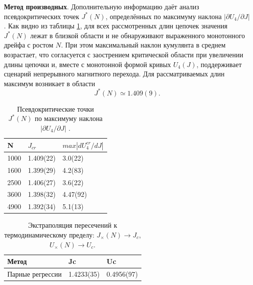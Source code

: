   
  
  
      \textbf{Метод производных}.  
  Дополнительную информацию даёт анализ псевдокритических точек $J^*(N)$, определённых по максимуму наклона $|\partial U_4/\partial J|$. 
  Как видно из таблицы \ref{tab:binder_derivative_points_XY}, для всех рассмотренных длин цепочек значения $J^*(N)$ лежат в близкой области и не обнаруживают выраженного монотонного дрейфа с ростом $N$. 
  При этом максимальный наклон кумулянта в среднем возрастает, что согласуется с заострением критической области при увеличении длины цепочки и, вместе с монотонной формой кривых $U_4(J)$, поддерживает сценарий непрерывного магнитного перехода.
Для рассматриваемых длин максимум
возникает в области
\[
J^*(N) \simeq 1.409(9).
\]
  
  \begin{table}
  	\caption{Псевдокритические точки $J^*(N)$ по максимуму наклона $|\partial U_4/\partial J|$ .}
  		\centering  
  	\label{tab:binder_derivative_points_XY}
  	\begin{tabular}{lll}
  		\toprule
  		N & $J_{cr}$ & $max|dU^{cr}_4/dJ| $\\ 
  		\midrule
  		1000 & 1.409(22) & 3.0(22) \\
  		1600 & 1.399(29) & 4.2(83) \\
  		2500 & 1.406(27) & 3.6(22) \\
  		3600 & 1.398(32) & 4.47(92) \\
  		4900 & 1.392(34) & 5.1(13) \\
  		\bottomrule
  	\end{tabular}
  \end{table}
    
    
    
    \begin{table}
    	\centering
    	\caption{Экстраполяция пересечений к термодинамическому пределу: $J_\times(N)\to J_c$, $U_\times(N)\to U_c$.}
    	\label{tab:binder_summary}
    	\begin{tabular}{lll}
    		\toprule
    	Метод & Jc & Uc   \\
    		\midrule
    	 Парные регрессии   & 1.4233(35) & 0.4956(97)  \\
    		\bottomrule
    	\end{tabular}
    \end{table}
    
    
    
